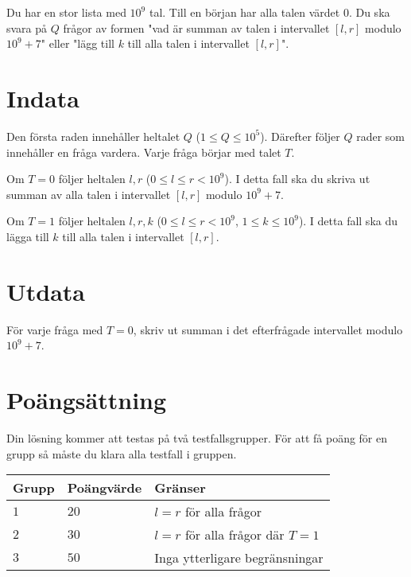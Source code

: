 Du har en stor lista med $10^9$ tal. Till en början har alla talen värdet $0$. Du ska svara på $Q$ frågor av formen "vad är summan av talen i intervallet $[l,r]$ modulo $10^9+7$" eller "lägg till $k$ till alla talen i intervallet $[l,r]$".

\section*{Indata}
Den första raden innehåller heltalet $Q$ ($1 \leq Q \leq 10^5$).
Därefter följer $Q$ rader som innehåller en fråga vardera. Varje fråga börjar med talet $T$.

Om $T=0$ följer heltalen $l,r$ ($0 \leq l \leq r < 10^9$). I detta fall ska du skriva ut summan av alla talen i intervallet $[l,r]$ modulo $10^9+7$.

Om $T=1$ följer heltalen $l,r,k$ ($0 \leq l \leq r < 10^9$, $1 \leq k \leq 10^9$). I detta fall ska du lägga till $k$ till alla talen i intervallet $[l,r]$.

\section*{Utdata}
För varje fråga med $T=0$, skriv ut summan i det efterfrågade intervallet modulo $10^9+7$.

\section*{Poängsättning}
Din lösning kommer att testas på två testfallsgrupper.
\noindent
För att få poäng för en grupp så måste du klara alla testfall i gruppen.

\noindent
\begin{tabular}{| l | l | l |}
\hline
  Grupp & Poängvärde & Gränser \\ \hline
  $1$    & $20$       &  $l=r$ för alla frågor \\ \hline
  $2$    & $30$       &  $l=r$ för alla frågor där $T=1$ \\ \hline
  $3$    & $50$       &  Inga ytterligare begränsningar \\ \hline
\end{tabular}
